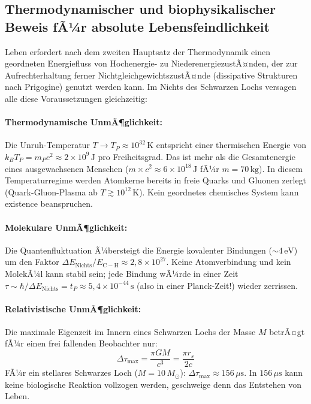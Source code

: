 ﻿\documentclass[12pt,a4paper]{report}
\begin{document}
\subsection{Thermodynamischer und biophysikalischer Beweis fÃ¼r absolute Lebensfeindlichkeit}

Leben erfordert nach dem zweiten Hauptsatz der Thermodynamik einen geordneten Energiefluss von Hochenergie- zu NiederenergiezustÃ¤nden, der zur Aufrechterhaltung ferner NichtgleichgewichtszustÃ¤nde (dissipative Strukturen nach Prigogine) genutzt werden kann. Im Nichts des Schwarzen Lochs versagen alle diese Voraussetzungen gleichzeitig:

\paragraph{Thermodynamische UnmÃ¶glichkeit:}
Die Unruh-Temperatur $T \to T_P \approx 10^{32}\,\text{K}$ entspricht einer thermischen Energie von $k_B T_P = m_P c^2 \approx 2 \times 10^9\,\text{J}$ pro Freiheitsgrad. Das ist mehr als die Gesamtenergie eines ausgewachsenen Menschen ($m \times c^2 \approx 6 \times 10^{18}\,\text{J}$ fÃ¼r $m = 70\,\text{kg}$). In diesem Temperaturregime werden Atomkerne bereits in freie Quarks und Gluonen zerlegt (Quark-Gluon-Plasma ab $T \gtrsim 10^{12}\,\text{K}$). Kein geordnetes chemisches System kann existence beanspruchen.

\paragraph{Molekulare UnmÃ¶glichkeit:}
Die Quantenfluktuation Ã¼bersteigt die Energie kovalenter Bindungen ($\sim 4\,\text{eV}$) um den Faktor $\Delta E_{\mathrm{Nichts}} / E_{\mathrm{C-H}} \approx 2{,}8 \times 10^{27}$. Keine Atomverbindung und kein MolekÃ¼l kann stabil sein; jede Bindung wÃ¼rde in einer Zeit $\tau \sim \hbar/\Delta E_{\mathrm{Nichts}} = t_P \approx 5{,}4 \times 10^{-44}\,\text{s}$ (also in einer Planck-Zeit!) wieder zerrissen.

\paragraph{Relativistische UnmÃ¶glichkeit:}
Die maximale Eigenzeit im Innern eines Schwarzen Lochs der Masse $M$ betrÃ¤gt fÃ¼r einen frei fallenden Beobachter nur:
\begin{equation*}
    \Delta\tau_{\max} = \frac{\pi G M}{c^3} = \frac{\pi r_s}{2c}
\end{equation*}
FÃ¼r ein stellares Schwarzes Loch ($M = 10\,M_\odot$): $\Delta\tau_{\max} \approx 156\,\mu\text{s}$. In $156\,\mu\text{s}$ kann keine biologische Reaktion vollzogen werden, geschweige denn das Entstehen von Leben.
\end{document}
